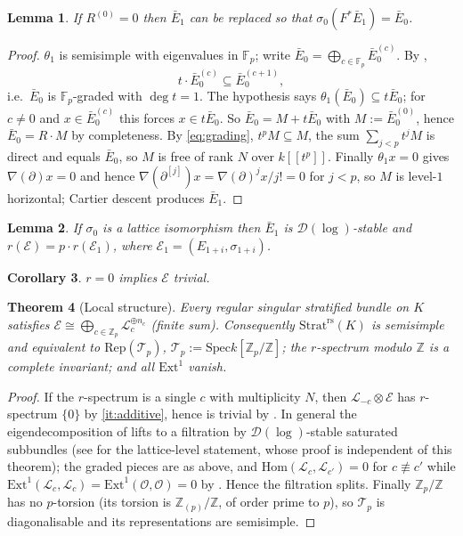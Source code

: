 \documentclass[11pt,reqno]{amsart}
\newcommand{\Zp}{\mathbb{Z}_p}
\newcommand{\Fp}{\mathbb{F}_p}
\newcommand{\ZZ}{\mathbb{Z}}
\newcommand{\cO}{\mathcal{O}}
\newcommand{\cD}{\mathcal{D}}
\newcommand{\cE}{\mathcal{E}}
\newcommand{\cL}{\mathcal{L}}
\newcommand{\cT}{\mathcal{T}}
\newcommand{\Strat}{\mathrm{Strat}}
\newcommand{\rs}{\mathrm{rs}}
\newcommand{\Rep}{\mathrm{Rep}}
\newcommand{\Hom}{\mathrm{Hom}}
\newcommand{\Ext}{\mathrm{Ext}}
\newcommand{\Spec}{\mathrm{Spec}}
\theoremstyle{plain}
\newtheorem{theorem}{Theorem}[section]
\newtheorem{lemma}[theorem]{Lemma}
\newtheorem{corollary}[theorem]{Corollary}
\theoremstyle{definition}
\theoremstyle{remark}
\numberwithin{equation}{section}
\begin{document}
\begin{lemma}\label{lem:res0}
If $R^{(0)}=0$ then $\bar E_1$ can be replaced so that
$\sigma_0(F^*\bar E_1)=\bar E_0$.
\end{lemma}
\begin{proof}
$\theta_1$ is semisimple with eigenvalues in $\Fp$; write
$\bar E_0=\bigoplus_{c\in\Fp}\bar E_0^{(c)}$.  By ,
\begin{equation}\label{eq:grading}
   t\cdot\bar E_0^{(c)}\subseteq\bar E_0^{(c+1)},
\end{equation}
i.e.\ $\bar E_0$ is $\Fp$-graded with $\deg t=1$.  The hypothesis says
$\theta_1(\bar E_0)\subseteq t\bar E_0$; for $c\ne0$ and
$x\in\bar E_0^{(c)}$ this forces $x\in t\bar E_0$.  So
$\bar E_0=M+t\bar E_0$ with $M:=\bar E_0^{(0)}$, hence $\bar E_0=R\cdot M$
by completeness.  By \eqref{eq:grading}, $t^pM\subseteq M$, the sum
$\sum_{j<p}t^jM$ is direct and equals $\bar E_0$, so $M$ is free of rank
$N$ over $k[[t^p]]$.  Finally $\theta_1x=0$ gives $\nabla(\partial)x=0$ and
hence $\nabla(\partial^{[j]})x=\nabla(\partial)^jx/j!=0$ for $j<p$, so $M$
is level-$1$ horizontal; Cartier descent produces $\bar E_1$.
\end{proof}

\begin{lemma}\label{lem:shift}
If $\sigma_0$ is a lattice isomorphism then $\bar E_1$ is
$\cD(\log)$-stable and $r(\cE)=p\cdot r(\cE_1)$, where
$\cE_1=(E_{1+i},\sigma_{1+i})$.
\end{lemma}

\begin{corollary}\label{cor:allzero}
$r=0$ implies $\cE$ trivial.
\end{corollary}

\begin{theorem}[Local structure]\label{thm:localstructure}
Every regular singular stratified bundle on $K$ satisfies
$\cE\cong\bigoplus_{c\in\Zp}\cL_c^{\oplus n_c}$ (finite sum).
Consequently $\Strat^{\rs}(K)$ is semisimple and equivalent to
$\Rep(\cT_p)$, $\cT_p:=\Spec k[\Zp/\ZZ]$; the $r$-spectrum modulo $\ZZ$ is
a complete invariant; and all $\Ext^1$ vanish.
\end{theorem}
\begin{proof}
If the $r$-spectrum is a single $c$ with multiplicity $N$, then
$\cL_{-c}\otimes\cE$ has $r$-spectrum $\{0\}$ by
\eqref{it:additive}, hence is trivial by
.  In general the eigendecomposition of
 lifts to a filtration by $\cD(\log)$-stable saturated
subbundles (see  for the lattice-level statement, whose
proof is independent of this theorem); the graded pieces are as above, and
$\Hom(\cL_c,\cL_{c'})=0$ for $c\not\equiv c'$ while
$\Ext^1(\cL_c,\cL_c)=\Ext^1(\cO,\cO)=0$ by .  Hence the
filtration splits.  Finally $\Zp/\ZZ$ has no $p$-torsion (its torsion is
$\ZZ_{(p)}/\ZZ$, of order prime to $p$), so $\cT_p$ is diagonalisable and
its representations are semisimple.
\end{proof}
\end{document}
